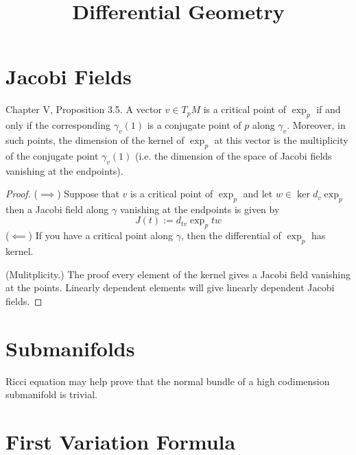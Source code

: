 



\title{Differential Geometry}
\maketitle

\label{section-phantom}

\tableofcontents

\section{Jacobi Fields}
\label{section-jacobi-fields}

\begin{proposition}
\label{proposition-critical-points-exp}
\cite{doc} Chapter V, Proposition 3.5. A vector $v \in T_pM$ is a critical
point of $\operatorname{exp}_p$ if and only if the corresponding 
$\gamma_v(1)$ is a conjugate point of $p$ along $\gamma_v$.
Moreover, in such points, the dimension of the kernel of 
$\operatorname{exp}_p$ at this vector is the multiplicity
of the conjugate point $\gamma_v(1)$ 
(i.e. the dimension of the space of Jacobi fields vanishing 
at the endpoints).
\end{proposition}

\begin{proof}
($\implies$) Suppose that $v$ is a critical point of $\operatorname{exp}_p$ and 
let $w \in \ker d_v \operatorname{exp}_p$ then a Jacobi field along $\gamma$ 
vanishing at the endpoints is given by
$$
J(t):=d_{tv}\operatorname{exp}_ptw
$$
($\impliedby$) If you have a critical point along $\gamma$, then the 
differential of $\operatorname{exp}_p$ has kernel.

(Mulitplicity.) The proof every element of the kernel gives a Jacobi
 field vanishing at the points. Linearly dependent elements will give 
 linearly dependent Jacobi fields.
\end{proof}
\section{Submanifolds}
\label{section-submanifolds}

\begin{remark}
\label{remark-ricci-equation}
Ricci equation may help prove that the normal bundle of a high codimension
submanifold is trivial.
\end{remark}
\section{First Variation Formula}
\label{section-first-variation}

